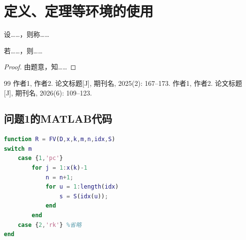 \documentclass[12pt,oneside]{../setup/hyit_S-2}
\begin{document}
\section{定义、定理等环境的使用}
\label{sec:DefThm}

\par%
\begin{definition}[<这里写定义的副标题>]
  设……，则称……
\end{definition}

\par%
\begin{theorem}[<这里写定理的副标题>]
  若……，则……
\end{theorem}

\par%
\begin{proof}
  由题意，知……
\end{proof}

\par

\makeSummary
\makeAcknowledgement

\begin{thebibliography}{99}
    作者1, 作者2. 论文标题[J], 期刊名, 2025(2): 167--173.
    作者1, 作者2. 论文标题[J], 期刊名, 2026(6): 109--123.
\end{thebibliography}

\makeappendix
\subsection{问题1的MATLAB代码}
\begin{lstlisting}[language=matlab,morekeywords={}]
function R = FV(D,x,k,m,n,idx,S)
switch m
    case {1,'pc'}
        for j = 1:x(k)-1
            n = n+1;
            for u = 1:length(idx)
                s = S(idx(u));
            end
        end
    case {2,'rk'} %省略
end
\end{lstlisting}
\end{document}
